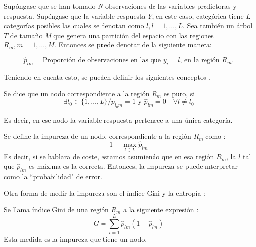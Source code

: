 \noindent Supóngase que se han tomado $N$ observaciones de las variables predictoras y respuesta. Supóngase que la variable respuesta $Y$, en este caso, categórica tiene $L$ categorías posibles las cuales se denotan como $l, l=1,\ldots,L$. Sea también un árbol $T$ de tamaño $M$ que genera una partición del espacio con las regiones $R_m, m=1,\ldots, M$. Entonces se puede denotar de la siguiente manera: 

\begin{equation}
\hat{p}_{lm}=\text{Proporción de observaciones en las que $y_i=l$, en la región $R_m$.}
\end{equation}

\noindent Teniendo en cuenta esto, se pueden definir los siguientes conceptos \cite{Divakaran 2022, Hastie 2001, James 2013, Brown 2004}.
\begin{defi}
Se dice que un nodo correspondiente a la región $R_m$ es puro, si 
\begin{equation}
\exists l_0\in \lbrace 1,\ldots, L\rbrace/ p_{l_0 m}=1 \text{ y }\hat{p}_{lm}=0 \quad \forall l\neq l_0 
\end{equation}

\noindent Es decir, en ese nodo la variable respuesta pertenece a una única categoría. 
\end{defi}

\begin{defi}
Se define la impureza de un nodo, correspondiente a la región $R_m$ como :
\begin{equation}
1-\max_{l\in L} \hat{p}_{lm}
\end{equation}
\noindent Es decir, si se hablara de coste, estamos asumiendo que en esa región $R_m$, la $l$ tal que $\hat{p}_{lm}$ es máxima es la correcta. Entonces, la impureza se puede interpretar como la ``probabilidad" de error. 
\end{defi}
\noindent Otra forma de medir la impureza son el índice Gini y la entropía \cite{Hastie 2001, Divakaran 2022, James 2013}:
\begin{defi}
Se llama índice Gini de una región $R_m$ a la siguiente expresión :
\begin{equation}
G=\sum_{l=1}^L\hat{p}_{lm}(1-\hat{p}_{lm})
\end{equation}
Esta medida es la impureza que tiene un nodo. 
\end{defi} 

